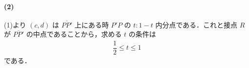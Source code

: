 \documentclass[../../main.tex]{subfiles}
\begin{document}
\paragraph{(2)}
(1)より $(c,d)$ は $\overline{PP'}$ 上にある時 $P'P$ の $t:1-t$ 内分点である．これと接点 $R$ が $\overline{PP'}$ の中点であることから，求める $t$ の条件は
\begin{align}
  \dfrac{1}{2}\le t\le1
\end{align}
である．

\newpage
\end{document}
